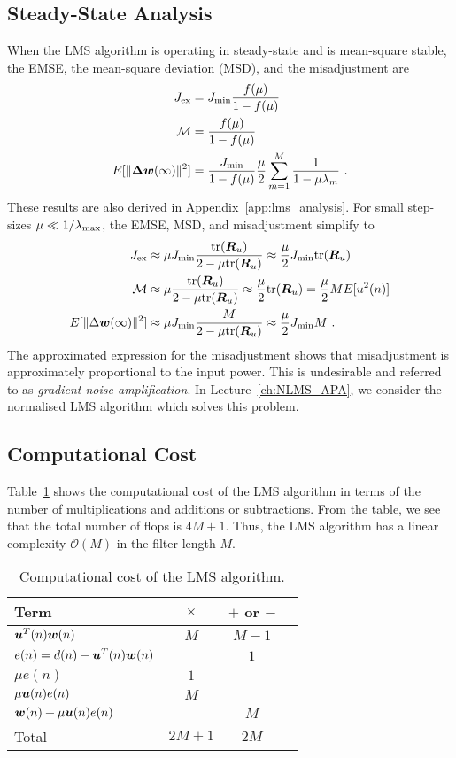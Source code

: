 \subsection{Steady-State Analysis}
When the LMS algorithm is operating in steady-state and is mean-square stable, the EMSE, the mean-square deviation (MSD), and the misadjustment are \cite[pp.~465]{Sayed2003}
\begin{align}
  J_\textup{ex} &= J_\textup{min}\frac{f(\mu)}{1-f(\mu)}\\
  \mathcal{M} &= \frac{f(\mu)}{1-f(\mu)}\\
  E[\|\boldsymbol{\Delta}\boldsymbol{w}(\infty)\|^2] &= \frac{J_\textup{min}}{1-f(\mu)}\frac{\mu}{2}\sum_{m=1}^M \frac{1}{1-\mu\lambda_m}\ .
\end{align}
These results are also derived in Appendix~\ref{app:lms_analysis}. For small step-sizes $\mu \ll 1/\lambda_\textup{max}$, the EMSE, MSD, and misadjustment simplify to \cite[pp.~465]{Sayed2003}
\begin{align}
  J_\textup{ex}&\approx \mu J_\textup{min}\frac{\textup{tr}(\boldsymbol{R}_u)}{2-\mu\textup{tr}(\boldsymbol{R}_u)}\approx \frac{\mu}{2}J_\textup{min}\textup{tr}(\boldsymbol{R}_u)\\
  \mathcal{M} & \approx \mu \frac{\textup{tr}(\boldsymbol{R}_u)}{2-\mu\textup{tr}(\boldsymbol{R}_u)} \approx \frac{\mu}{2}\textup{tr}(\boldsymbol{R}_u) = \frac{\mu}{2}ME[u^2(n)]\\
  E[\|\Delta\boldsymbol{w}(\infty)\|^2] &\approx \mu J_\textup{min}\frac{M}{2-\mu\textup{tr}(\boldsymbol{R}_u)} \approx \frac{\mu}{2}J_\textup{min}M\ .
\end{align}
The approximated expression for the misadjustment shows that misadjustment is approximately proportional to the input power. This is undesirable and referred to as \textit{gradient noise amplification}. In Lecture~\ref{ch:NLMS_APA}, we consider the normalised LMS algorithm which solves this problem.

\subsection{Computational Cost}
Table~\ref{tab:comp_cost_lms} shows the computational cost of the LMS algorithm in terms of the number of multiplications and additions or subtractions. From the table, we see that the total number of flops is $4M+1$. Thus, the LMS algorithm has a linear complexity $\mathcal{O}(M)$ in the filter length $M$.
\begin{table}[htbp]
  \centering
  \begin{tabular}{l c c c}
    \toprule
    Term & $\times$ & $+$ or $-$ \\
    \midrule
    $\boldsymbol{u}^T(n)\boldsymbol{w}(n)$ & $M$ & $M-1$ \\
    $e(n)=d(n)-\boldsymbol{u}^T(n)\boldsymbol{w}(n)$ & & $1$ \\
    $\mu e(n)$ & $1$ & \\
    $\mu \boldsymbol{u}(n)e(n)$ & $M$ & \\
    $\boldsymbol{w}(n)+\mu \boldsymbol{u}(n)e(n)$ &  & $M$ \\
    \midrule
    Total & $2M+1$ & $2M$ \\
    \bottomrule
  \end{tabular}
  \caption{Computational cost of the LMS algorithm.}
  \label{tab:comp_cost_lms}
\end{table}
